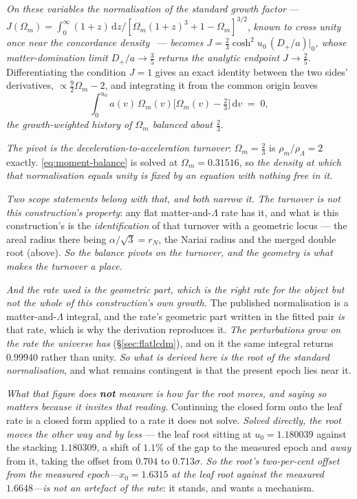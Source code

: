 \documentclass[11pt,a4paper]{article}
\theoremstyle{plain}
\theoremstyle{definition}
\theoremstyle{remark}
\newcommand{\dd}{\mathrm{d}}   %
\begin{document}
\emph{On these variables the normalisation of the standard growth factor} ---
$J(\Omega_m)=\int_{0}^{\infty}(1+z)\,\dd z/[\Omega_m(1+z)^{3}+1-\Omega_m]^{3/2}$, \emph{known to cross unity
once near the concordance density}~\cite{JanzenGrowthNorm} --- \emph{becomes
$J=\tfrac23\cosh^{2}u_{0}\,(D_{+}/a)|_{0}$, whose matter-domination limit
$D_{+}/a\to\tfrac35$ returns the analytic endpoint $J\to\tfrac25$.} Differentiating the condition $J=1$ gives
an exact identity between the two sides' derivatives, $\propto\tfrac92\Omega_m-2$, and integrating it from the
common origin leaves
\begin{equation}\label{eq:moment-balance}
\int_{0}^{u_{0}} a(v)\,\Omega_m(v)\bigl[\Omega_m(v)-\tfrac23\bigr]\,\dd v \;=\; 0 ,
\end{equation}
\emph{the growth-weighted history of $\Omega_m$ balanced about $\tfrac23$}.

\emph{The pivot is the deceleration-to-acceleration turnover}: $\Omega_m=\tfrac23$ is
$\rho_m/\rho_\Lambda=2$ exactly. \eqref{eq:moment-balance} is solved at $\Omega_m=0.31516$, so \emph{the
density at which that normalisation equals unity is fixed by an equation with nothing free in it}.

\emph{Two scope statements belong with that, and both narrow it.} \emph{The turnover is not this
construction's property}: any flat matter-and-$\Lambda$ rate has it, and what is this construction's is the
\emph{identification} of that turnover with a geometric locus --- the areal radius there being
$\alpha/\sqrt3=r_{N}$, the Nariai radius and the merged double root (above). \emph{So
the balance pivots on the turnover, and the geometry is what makes the turnover a place.}

\emph{And the rate used is the geometric part, which is the right rate for the object but not the whole of
this construction's own growth.} The published normalisation is a matter-and-$\Lambda$ integral, and the
rate's geometric part written in the fitted pair \emph{is} that rate, which is why the derivation reproduces it.
\emph{The perturbations grow on the rate the universe has} (\S\ref{sec:flatlcdm}), and on it the same integral
returns $0.99940$ rather than unity. \emph{So what is derived here is the root of the standard
normalisation}, and what remains contingent is that the present epoch lies near it.

\emph{What that figure does \textbf{not} measure is how far the root moves, and saying so matters because it
invites that reading.} Continuing the closed form onto the leaf rate is a closed form applied to a rate it
does not solve. \emph{Solved directly, the root moves the other way and by less} --- the leaf root sitting at
$u_0=1.180039$ against the stacking $1.180309$, a shift of $1.1\%$ of the gap to the measured epoch and
\emph{away} from it, taking the offset from $0.704$ to
$0.713\sigma$. \emph{So
the root's two-per-cent offset from the measured epoch---$x_{0}=1.6315$ at the leaf root against the measured
$1.6648$---is not an artefact of the rate}: it stands, and wants a mechanism.
\end{document}
